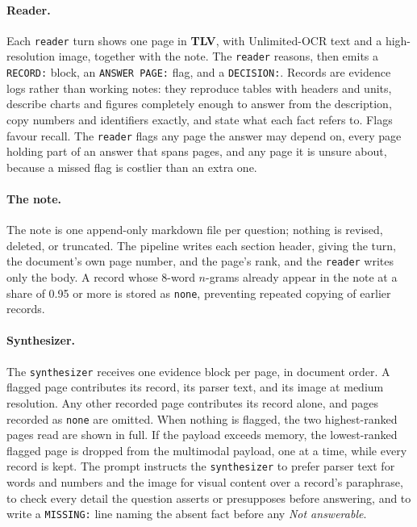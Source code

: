 \paragraph{Reader.}
Each \texttt{reader} turn shows one page in \textbf{TLV}, with Unlimited-OCR text and a high-resolution image, together with the note. The \texttt{reader} reasons, then emits a \texttt{RECORD:} block, an \texttt{ANSWER PAGE:} flag, and a \texttt{DECISION:}. Records are evidence logs rather than working notes: they reproduce tables with headers and units, describe charts and figures completely enough to answer from the description, copy numbers and identifiers exactly, and state what each fact refers to. Flags favour recall. The \texttt{reader} flags any page the answer may depend on, every page holding part of an answer that spans pages, and any page it is unsure about, because a missed flag is costlier than an extra one.

\paragraph{The note.}
The note is one append-only markdown file per question; nothing is revised, deleted, or truncated. The pipeline writes each section header, giving the turn, the document's own page number, and the page's rank, and the \texttt{reader} writes only the body. A record whose 8-word $n$-grams already appear in the note at a share of 0.95 or more is stored as \texttt{none}, preventing repeated copying of earlier records.

\paragraph{Synthesizer.}
The \texttt{synthesizer} receives one evidence block per page, in document order. A flagged page contributes its record, its parser text, and its image at medium resolution. Any other recorded page contributes its record alone, and pages recorded as \texttt{none} are omitted. When nothing is flagged, the two highest-ranked pages read are shown in full. If the payload exceeds memory, the lowest-ranked flagged page is dropped from the multimodal payload, one at a time, while every record is kept. The prompt instructs the \texttt{synthesizer} to prefer parser text for words and numbers and the image for visual content over a record's paraphrase, to check every detail the question asserts or presupposes before answering, and to write a \texttt{MISSING:} line naming the absent fact before any \emph{Not answerable}.

